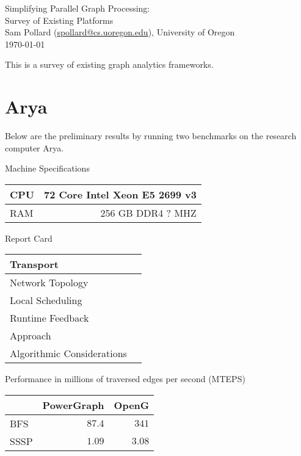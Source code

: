 \documentclass[11pt]{article}
\begin{document}
\begin{center}
{ \huge
	Simplifying Parallel Graph Processing: \\
}
{ \Large
	Survey of Existing Platforms \\
}
Sam Pollard (\href{mailto:spollard@cs.uoregon.edu}{spollard@cs.uoregon.edu}), University of Oregon \\
\today
\end{center}

This is a survey of existing graph analytics frameworks.

\section{Arya}
Below are the preliminary results by running two benchmarks on the research computer Arya.

Machine Specifications


\begin{tabular}{lr}
CPU & 72 Core Intel Xeon E5 2699 v3\\ \hline
RAM & 256 GB DDR4 ? MHZ
\end{tabular}

Report Card

\begin{tabular}{lr}
Transport & \\ \hline
Network Topology & \\ \hline
Local Scheduling & \\ \hline
Runtime Feedback & \\ \hline
Approach & \\ \hline
Algorithmic Considerations & \\ \hline
\end{tabular}

Performance in millions of traversed edges per second (MTEPS)

\begin{tabular}{l|r|r}
 & PowerGraph & OpenG \\ \hline
BFS & $87.4$ & $341$ \\ \hline
SSSP & $1.09$ & $3.08$ \\ \hline
\end{tabular}
\end{document}
